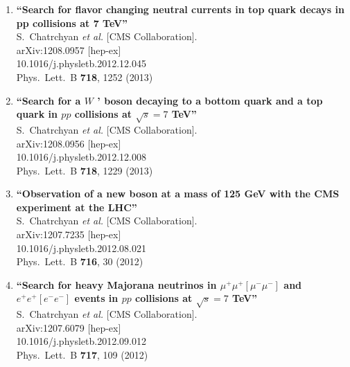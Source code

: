\documentclass{article}
\begin{document}
\begin{enumerate}
\item%
{\bf ``Search for flavor changing neutral currents in top quark decays in pp collisions at 7 TeV''}
  \\{}S.~Chatrchyan {\it et al.}  [CMS Collaboration].
  \\{}arXiv:1208.0957 [hep-ex]
    \\{}10.1016/j.physletb.2012.12.045
\\{}Phys.\ Lett.\ B {\bf 718}, 1252 (2013) %


\item%
{\bf ``Search for a $W$ ' boson decaying to a bottom quark and a top quark in $pp$ collisions at $\sqrt{s}=7$ TeV''}
  \\{}S.~Chatrchyan {\it et al.}  [CMS Collaboration].
  \\{}arXiv:1208.0956 [hep-ex]
    \\{}10.1016/j.physletb.2012.12.008
\\{}Phys.\ Lett.\ B {\bf 718}, 1229 (2013) %


\item%
{\bf ``Observation of a new boson at a mass of 125 GeV with the CMS experiment at the LHC''}
  \\{}S.~Chatrchyan {\it et al.}  [CMS Collaboration].
  \\{}arXiv:1207.7235 [hep-ex]
    \\{}10.1016/j.physletb.2012.08.021
\\{}Phys.\ Lett.\ B {\bf 716}, 30 (2012) %


\item%
{\bf ``Search for heavy Majorana neutrinos in $\mu^+\mu^+[\mu^-\mu^-]$ and $e^+e^+[e^-e^-]$ events in $pp$ collisions at $\sqrt{s} = 7$ TeV''}
  \\{}S.~Chatrchyan {\it et al.}  [CMS Collaboration].
  \\{}arXiv:1207.6079 [hep-ex]
    \\{}10.1016/j.physletb.2012.09.012
\\{}Phys.\ Lett.\ B {\bf 717}, 109 (2012) %



\end{enumerate}
\end{document}
